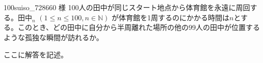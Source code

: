 \begin{prob}{100}{}{suiso\_728660 様}
 100人の田中が同じスタート地点から体育館を永遠に周回する。$\mathrm{田中}_n$ $(1\le n \le 100, n\in\mathbb{N})$ が体育館を1周するのにかかる時間は$n$とする。このとき、どの田中に自分から半周離れた場所の他の99人の田中が位置するような孤独な瞬間が訪れるか。
\end{prob}
ここに解答を記述。